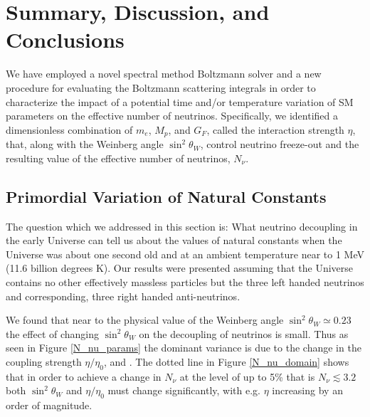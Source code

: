 
\section{Summary, Discussion, and Conclusions}\label{sec:concl}
We have employed a novel spectral method Boltzmann solver and a new procedure for evaluating the Boltzmann scattering integrals in order to characterize the impact of a potential time and/or temperature variation of SM parameters on the effective number of neutrinos. Specifically, we identified a dimensionless combination of $m_e$, $M_p$, and $G_F$, called the interaction strength $\eta$, that, along with the Weinberg angle $\sin^2 \theta_W$, control neutrino freeze-out and the resulting value of the effective number of neutrinos, $N_\nu$.  

\subsection{Primordial Variation of Natural Constants}
The question which we addressed in this section is: What neutrino decoupling in the early Universe can tell us about the values of natural constants when the Universe was about one second old and at an ambient temperature near to 1 MeV (11.6 billion degrees K). Our results were presented assuming that the Universe contains no other effectively massless particles but the three left handed neutrinos and corresponding, three right handed anti-neutrinos. 

We found that near to the physical value of the Weinberg angle  $\sin^2 \theta_W\simeq 0.23$ the effect of changing $\sin^2\theta_W$ on the decoupling of neutrinos is small. Thus as seen in Figure \ref{N_nu_params}  the dominant variance is due to the change  in the coupling strength $\eta/\eta_0$,   and . The dotted line in  Figure \ref{N_nu_domain} shows that in order to achieve a change in $N_\nu$ at the level of up to 5\% that is  $N_\nu\lesssim 3.2 $  both $\sin^2 \theta_W$ and $\eta/\eta_0$ must change significantly, with e.g. $\eta$ increasing by an order of magnitude.

